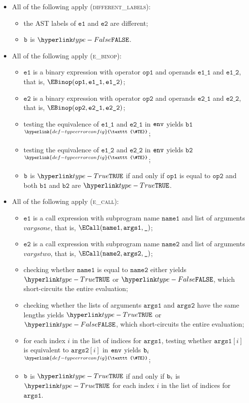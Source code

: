 \documentclass{book}
\newcommand\TypeErrorConfig[0]{\hyperlink{def-typeerrorconfig}{\texttt{\#TE}}}
\newcommand\ProseOrTypeError[0]{\hyperlink{def-proseortypeerror}{$^{\TypeErrorConfig}$}}
\newcommand\veone[0]{\texttt{e1}}
\newcommand\vetwo[0]{\texttt{e2}}
\newcommand\opone[0]{\texttt{op1}}
\newcommand\optwo[0]{\texttt{op2}}
\newcommand\veoneone[0]{\texttt{e1\_1}}
\newcommand\veonetwo[0]{\texttt{e1\_2}}
\newcommand\vetwoone[0]{\texttt{e2\_1}}
\newcommand\vetwotwo[0]{\texttt{e2\_2}}
\newcommand\vbone[0]{\texttt{b1}}
\newcommand\vbtwo[0]{\texttt{b2}}
\newcommand\nameone[0]{\texttt{name1}}
\newcommand\nametwo[0]{\texttt{name2}}
\newcommand\vargsone[0]{\texttt{args1}}
\newcommand\vargstwo[0]{\texttt{args2}}
\begin{document}
\begin{itemize}
  \item All of the following apply (\textsc{different\_labels}):
  \begin{itemize}
    \item the AST labels of $\veone$ and $\vetwo$ are different;
    \item $\texttt{b}$ is $\False$.
  \end{itemize}

  \item All of the following apply (\textsc{e\_binop}):
  \begin{itemize}
    \item $\veone$ is a binary expression with operator $\opone$ and operands $\veoneone$ and $\veonetwo$,
          that is, $\EBinop(\opone, \veoneone, \veonetwo)$;
    \item $\vetwo$ is a binary expression with operator $\optwo$ and operands $\vetwoone$ and $\vetwotwo$,
          that is, $\EBinop(\optwo, \vetwoone, \vetwotwo)$;
    \item testing the equivalence of $\veoneone$ and $\vetwoone$ in $\texttt{env}$ yields $\vbone$ \ProseOrTypeError;
    \item testing the equivalence of $\veonetwo$ and $\vetwotwo$ in $\texttt{env}$ yields $\vbtwo$ \ProseOrTypeError;
    \item $\texttt{b}$ is $\True$ if and only if $\opone$ is equal to $\optwo$ and both $\vbone$ and $\vbtwo$ are $\True$.
  \end{itemize}

  \item All of the following apply (\textsc{e\_call}):
  \begin{itemize}
    \item $\veone$ is a call expression with subprogram name $\nameone$ and list of arguments $vargsone$,
          that is, $\ECall(\nameone, \vargsone, \Ignore)$;
    \item $\vetwo$ is a call expression with subprogram name $\nametwo$ and list of arguments $vargstwo$,
          that is, $\ECall(\nametwo, \vargstwo, \Ignore)$;
    \item checking whether $\nameone$ is equal to $\nametwo$ either yields $\True$ or $\False$, which short-circuits the entire evaluation;
    \item checking whether the lists of arguments $\vargsone$ and $\vargstwo$ have the same lengths yields
          $\True$ or $\False$, which short-circuits the entire evaluation;
    \item for each index $i$ in the list of indices for $\vargsone$, testing whether $\vargsone[i]$ is equivalent to $\vargstwo[i]$
          in $\texttt{env}$ yields $\texttt{b}_i$ \ProseOrTypeError;
    \item $\texttt{b}$ is $\True$ if and only if $\texttt{b}_i$ is $\True$ for each index $i$ in the list of indices for $\vargsone$.
  \end{itemize}


\end{itemize}
\end{document}
